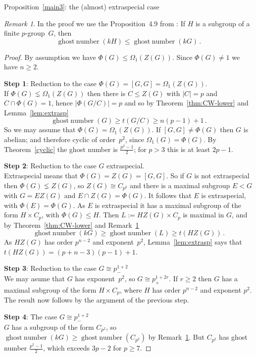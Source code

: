 \documentclass[12pt,reqno]{amsart}
\theoremstyle{definition}
\theoremstyle{remark}
\newtheorem{rem}[thm]{Remark}
\begin{document}
\begin{section}{Proposition~\ref{main3}: the (almost) extraspecial case}
\begin{rem}
\label{rem:subgp}
In the proof we use the Proposition~4.9 from \cite{CheboluChristensenMinac:ghosts}: If $H$ is a subgroup of a finite $p$-group~$G$, then
\[
{\operatorname{ghost\;number}}(kH) \leq {\operatorname{ghost\;number}}(kG) \, .
\]
\end{rem}

\begin{proof}
By assumption we have $\Phi(G) \leq \Omega_1(Z(G))$. Since $\Phi(G) \neq 1$ we have $n \geq 2$.
\item \textbf{Step 1}: Reduction to the case $\Phi(G) = [G,G] = \Omega_1(Z(G))$. \\
If $\Phi(G) \lneq \Omega_1(Z(G))$ then there is $C \leq Z(G)$ with ${\left\vert{C}\right\vert} = p$ and $C \cap \Phi(G) = 1$, hence ${\left\vert{\Phi(G/C)}\right\vert} = p$ and so by Theorem~\ref{thm:CW-lower} and Lemma~\ref{lem:extrasp}
\[
{\operatorname{ghost\;number}}(G) \geq t(G/C) \geq n(p-1) +1 \, .
\]
So we may assume that $\Phi(G) = \Omega_1(Z(G))$. If $[G,G] \neq \Phi(G)$ then $G$ is abelian; and therefore cyclic of order~$p^2$, since $\Omega_1(G) = \Phi(G)$. By Theorem~\ref{cyclic} the ghost number is $\frac{p^2-1}{2}$; for $p > 3$ this is at least $2p-1$.
\item \textbf{Step 2}: Reduction to the case $G$ extraspecial. \\
Extraspecial means that $\Phi(G) = Z(G) = [G,G]$. So if $G$ is not extraspecial then $\Phi(G) \lneq Z(G)$, so $Z(G) \cong C_{p^2}$ and there is a maximal subgroup $E < G$ with $G = EZ(G)$ and $E \cap Z(G) = \Phi(G)$. It follows that $E$ is extraspecial, with $\Phi(E) = \Phi(G)$. As $E$ is extraspecial it has a maximal subgroup of the form $H \times C_p$, with $\Phi(G) \leq H$. Then $L := HZ(G) \times C_p$ is maximal in $G$, and by Theorem~\ref{thm:CW-lower} and Remark~\ref{rem:subgp}
\[
{\operatorname{ghost\;number}}(kG) \geq {\operatorname{ghost\;number}}(L) \geq t(HZ(G)) \, .
\]
As $HZ(G)$ has order $p^{n-2}$ and exponent~$p^2$, Lemma~\ref{lem:extrasp} says that $t(HZ(G)) = (p+n-3)(p-1)+1$.
\item \textbf{Step 3}: Reduction to the case $G \cong p^{1+2}_-$ \\
We may asume that $G$ has exponent~$p^2$, so $G \cong p^{1+2r}_+$. If $r \geq 2$ then $G$ has a maximal subgroup of the form $H \times C_p$, where $H$ has order $p^{n-2}$ and exponent $p^2$. The result now follows by the argument of the previous step.
\item \textbf{Step 4}: The case $G \cong p^{1+2}_-$ \\
$G$ has a subgroup of the form $C_{p^2}$,
so ${\operatorname{ghost\;number}}(kG) \geq {\operatorname{ghost\;number}}(C_{p^2})$ by Remark~\ref{rem:subgp}\@. But $C_{p^2}$ has ghost number $\frac{p^2-1}{2}$, which exceeds $3p-2$ for $p \geq 7$.
\end{proof}

\end{section}
\end{document}
